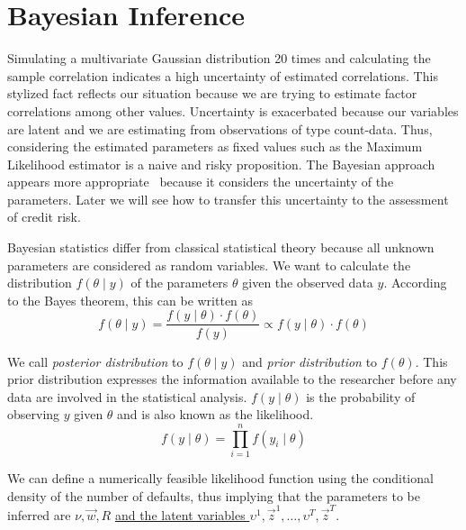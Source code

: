 \documentclass[11pt,fleqn]{book} %
\begin{document}
\section{Bayesian Inference}

Simulating a multivariate Gaussian distribution 20 times and calculating 
the sample correlation indicates a high uncertainty of estimated correlations. 
This stylized fact reflects our situation because we are trying to estimate 
factor correlations among other values. Uncertainty is exacerbated because 
our variables are latent and we are estimating from observations of type 
count-data. Thus, considering the estimated parameters as fixed values such 
as the Maximum Likelihood estimator is a naive and risky proposition. 
The Bayesian approach appears more appropriate~\cite{gossl:2005,tarashev:2010}
because it considers the uncertainty of the parameters. Later we will see 
how to transfer this uncertainty to the assessment of credit risk.

Bayesian statistics differ from classical statistical theory because all 
unknown parameters are considered as random variables. We want to calculate 
the distribution $f(\theta \mid y)$ of the parameters $\theta$ given the 
observed data $y$. According to the Bayes theorem, this can be written as
\begin{displaymath}
	f(\theta \mid y) = \frac{f(y \mid \theta) \cdot f(\theta)}{f(y)} \propto f(y \mid \theta) \cdot f(\theta)
\end{displaymath}

We call \emph{posterior distribution} to $f(\theta \mid y)$ and 
\emph{prior distribution} to $f(\theta)$. This prior distribution 
expresses the information available to the researcher before 
any data are involved in the statistical analysis. $f(y \mid \theta)$ 
is the probability of observing $y$ given $\theta$ and is also 
known as the likelihood.
\begin{displaymath}
	f(y \mid \theta) = \prod_{i=1}^n f(y_i \mid \theta)
\end{displaymath}

We can define a numerically feasible likelihood function using the 
conditional density of the number of defaults, thus implying that the 
parameters to be inferred are $\nu,\vec{w},R$ \ul{and the latent variables 
$\upsilon^1,\vec{z}^1,\dots,\upsilon^T,\vec{z}^T$}.
\end{document}
